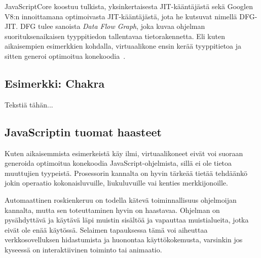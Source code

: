 JavaScriptCore koostuu tulkista, yksinkertaisesta JIT-kääntäjästä sekä Googlen V8:n innoittamana optimoivasta JIT-kääntäjästä, jota he kutsuvat nimellä DFG-JIT. DFG tulee sanoista \textit{Data Flow Graph}, joka kuvaa ohjelman suorituksenaikaisen tyyppitiedon tallentavaa tietorakennetta. Eli kuten aikaisempien esimerkkien kohdalla, virtuaalikone ensin kerää tyyppitietoa ja sitten generoi optimoitua konekoodia~\cite{javascriptcore}.

\subsection{Esimerkki: Chakra}

Tekstiä tähän...

\subsection{JavaScriptin tuomat haasteet}

Kuten aikaisemmista esimerkeistä käy ilmi, virtuaalikoneet eivät voi suoraan generoida optimoitua konekoodia JavaScript-ohjelmista, sillä ei ole tietoa muuttujien tyypeistä. Prosessorin kannalta on hyvin tärkeää tietää tehdäänkö jokin operaatio kokonaisluvuille, liukuluvuille vai kenties merkkijonoille.

Automaattinen roskienkeruu on todella kätevä toiminnallisuus ohjelmoijan kannalta, mutta sen toteuttaminen hyvin on haastavaa. Ohjelman on pysähdyttävä ja käytävä läpi muistin sisältöä ja vapauttaa muistialueita, jotka eivät ole enää käytössä. Selaimen tapauksessa tämä voi aiheuttaa verkkosovelluksen hidastumista ja huonontaa käyttökokemusta, varsinkin jos kyseessä on interaktiivinen toiminto tai animaatio.